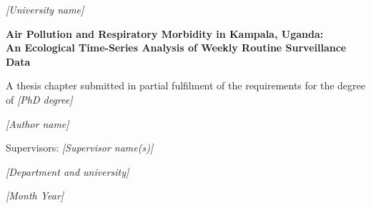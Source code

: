 \documentclass[12pt,a4paper]{report}
\newcommand{\placeholder}[1]{\textit{[#1]}}
\begin{document}
\begin{titlepage}
\centering
\vspace*{2cm}
{\Large \placeholder{University name} \par}
\vspace{1.5cm}
{\Large\bfseries Air Pollution and Respiratory Morbidity in Kampala, Uganda:\\
An Ecological Time-Series Analysis of Weekly Routine Surveillance Data\par}
\vspace{1.5cm}
{\large A thesis chapter submitted in partial fulfilment of the requirements for the degree of \placeholder{PhD degree}\par}
\vspace{1.5cm}
{\large \placeholder{Author name}\par}
\vfill
{\large Supervisors: \placeholder{Supervisor name(s)}\par}
\vspace{0.7cm}
{\large \placeholder{Department and university}\par}
\vspace{0.7cm}
{\large \placeholder{Month Year}\par}
\end{titlepage}

\end{document}
